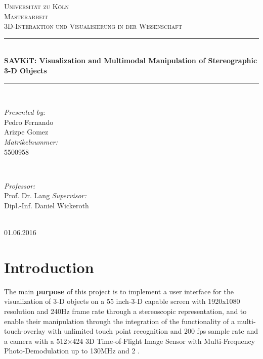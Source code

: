 \documentclass[12pt]{extarticle}
\date{}
\begin{document}
\begin{titlepage}
\newcommand{\HRule}{\rule{\linewidth}{0.5mm}}
\center
\textsc{\LARGE Universität zu Köln}\\[1.5cm]
\textsc{\Large Masterarbeit}\\[0.5cm] 
\textsc{\large 3D-Interaktion und Visualisierung
 in der Wissenschaft}\\[0.5cm] 
\HRule \\[0.4cm]
{ \Large \bfseries 
SAVKiT: Visualization and Multimodal Manipulation of Stereographic 3-D Objects}\\[0.4cm]
\HRule \\[1.5cm]
\begin{minipage}{0.4\textwidth}
\begin{flushleft} \large
\emph{Presented by:}\\
Pedro Fernando \\
Arizpe Gomez\\ 
\emph{Matrikelnummer:}\\
5500958 
\end{flushleft}
\end{minipage}
~
\begin{minipage}{0.4\textwidth}
\begin{flushright}
\large\emph{Professor:} \\
Prof. Dr. Lang
\large\emph{Supervisor:} \\
Dipl.-Inf. Daniel Wickeroth
\end{flushright}
\end{minipage}\\[4cm]
{\large 01.06.2016}\\[3cm] 
\vfill 
\end{titlepage}
\tableofcontents
\pagebreak{}
\printnomenclature
\section{Introduction} \label{sec:Int}
The main \textbf{purpose} of this project is to implement a user interface for the visualization of 3-D objects on a 55 inch-3-D capable screen with 1920x1080 resolution and 240Hz frame rate through a stereoscopic representation, and to enable their manipulation through the integration of the functionality of a multi-touch-overlay with unlimited touch point recognition and 200 fps sample rate and a camera with a 512×424  3D Time-of-Flight Image Sensor with Multi-Frequency Photo-Demodulation up to 130MHz and 2 .
\end{document}

